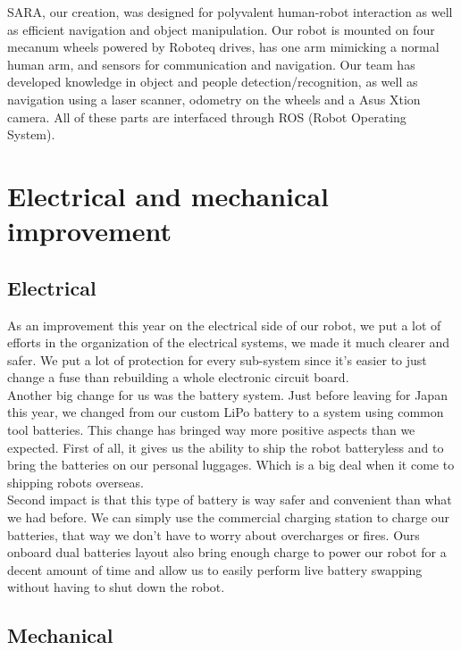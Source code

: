 \documentclass[runningheads,a4paper]{llncs}
\begin{document}
SARA, our creation, was designed for polyvalent human-robot interaction as well as efficient navigation and object manipulation. Our robot is mounted on four mecanum wheels powered by Roboteq drives, has one arm mimicking a normal human arm, and sensors for communication and navigation. Our team has developed knowledge in object and people detection/recognition, as well as navigation using a laser scanner, odometry on the wheels and a Asus Xtion camera. All of these parts are interfaced through ROS (Robot Operating System). \\

\section{Electrical and mechanical improvement}
\subsection{Electrical}

\tab As an improvement this year on the electrical side of our robot, we put a lot of efforts in the organization of the electrical systems, we made it much clearer and safer. We put a lot of protection for every sub-system since it’s easier to just change a fuse than rebuilding a whole electronic circuit board.\\

Another big change for us was the battery system. Just before leaving for Japan this year, we changed from our custom LiPo battery to a system using common tool batteries. This change has bringed way more positive aspects than we expected. First of all, it gives us the ability to ship the robot batteryless and to bring the batteries on our personal luggages. Which is a big deal when it come to shipping robots overseas.\\

Second impact is that this type of battery is way safer and convenient than what we had before. We can simply use the commercial charging station to charge our batteries, that way we don’t have to worry about overcharges or fires. Ours onboard dual batteries layout also bring enough charge to power our robot for a decent amount of time and allow us to easily perform live battery swapping without having to shut down the robot.\\



\subsection{Mechanical}
\end{document}
